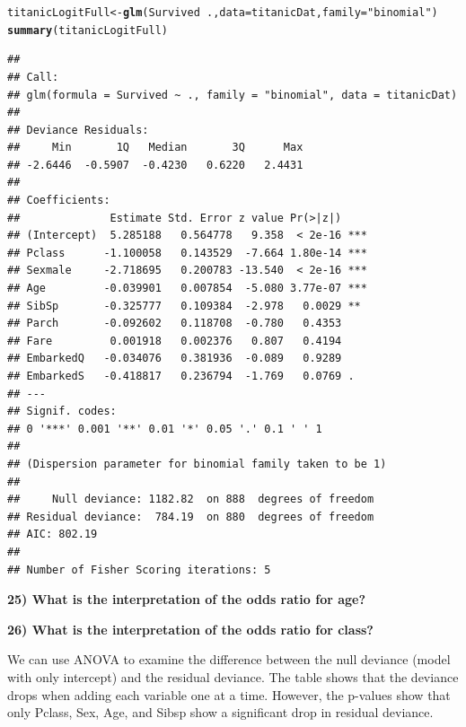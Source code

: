 \documentclass{article}\usepackage[]{graphicx}\usepackage[]{color}
\makeatletter
\newcommand{\hlstr}[1]{\textcolor[rgb]{0.192,0.494,0.8}{#1}}%
\newcommand{\hlopt}[1]{\textcolor[rgb]{0,0,0}{#1}}%
\newcommand{\hlstd}[1]{\textcolor[rgb]{0.345,0.345,0.345}{#1}}%
\newcommand{\hlkwb}[1]{\textcolor[rgb]{0.69,0.353,0.396}{#1}}%
\newcommand{\hlkwc}[1]{\textcolor[rgb]{0.333,0.667,0.333}{#1}}%
\newcommand{\hlkwd}[1]{\textcolor[rgb]{0.737,0.353,0.396}{\textbf{#1}}}%
\newenvironment{kframe}{%
 \def\at@end@of@kframe{}%
 \ifinner\ifhmode%
  \def\at@end@of@kframe{\end{minipage}}%
  \begin{minipage}{\columnwidth}%
 \fi\fi%
 \def\FrameCommand##1{\hskip\@totalleftmargin \hskip-\fboxsep
 \colorbox{shadecolor}{##1}\hskip-\fboxsep
     \hskip-\linewidth \hskip-\@totalleftmargin \hskip\columnwidth}%
 \MakeFramed {\advance\hsize-\width
   \@totalleftmargin\z@ \linewidth\hsize
   \@setminipage}}%
 {\par\unskip\endMakeFramed%
 \at@end@of@kframe}
\newenvironment{knitrout}{}{} %
\makeatother
\begin{document}
\begin{knitrout}
\color{fgcolor}\begin{kframe}
\begin{alltt}
\hlstd{titanicLogitFull} \hlkwb{<-} \hlkwd{glm}\hlstd{(Survived} \hlopt{~} \hlstd{.,} \hlkwc{data} \hlstd{= titanicDat,} \hlkwc{family} \hlstd{=} \hlstr{"binomial"}\hlstd{)}
\hlkwd{summary}\hlstd{(titanicLogitFull)}
\end{alltt}
\begin{verbatim}
## 
## Call:
## glm(formula = Survived ~ ., family = "binomial", data = titanicDat)
## 
## Deviance Residuals: 
##     Min       1Q   Median       3Q      Max  
## -2.6446  -0.5907  -0.4230   0.6220   2.4431  
## 
## Coefficients:
##              Estimate Std. Error z value Pr(>|z|)    
## (Intercept)  5.285188   0.564778   9.358  < 2e-16 ***
## Pclass      -1.100058   0.143529  -7.664 1.80e-14 ***
## Sexmale     -2.718695   0.200783 -13.540  < 2e-16 ***
## Age         -0.039901   0.007854  -5.080 3.77e-07 ***
## SibSp       -0.325777   0.109384  -2.978   0.0029 ** 
## Parch       -0.092602   0.118708  -0.780   0.4353    
## Fare         0.001918   0.002376   0.807   0.4194    
## EmbarkedQ   -0.034076   0.381936  -0.089   0.9289    
## EmbarkedS   -0.418817   0.236794  -1.769   0.0769 .  
## ---
## Signif. codes:  
## 0 '***' 0.001 '**' 0.01 '*' 0.05 '.' 0.1 ' ' 1
## 
## (Dispersion parameter for binomial family taken to be 1)
## 
##     Null deviance: 1182.82  on 888  degrees of freedom
## Residual deviance:  784.19  on 880  degrees of freedom
## AIC: 802.19
## 
## Number of Fisher Scoring iterations: 5
\end{verbatim}
\end{kframe}
\end{knitrout}

\vspace{5mm}

\textbf{25) What is the interpretation of the odds ratio for age?}

\vspace{20mm}

\textbf{26) What is the interpretation of the odds ratio for class?}

\vspace{20mm}

We can use ANOVA to examine the difference between the null deviance (model with only intercept) and the residual deviance. The table shows that the deviance drops when adding each variable one at a time. However, the p-values show that only Pclass, Sex, Age, and Sibsp show a significant drop in residual deviance.
\end{document}
